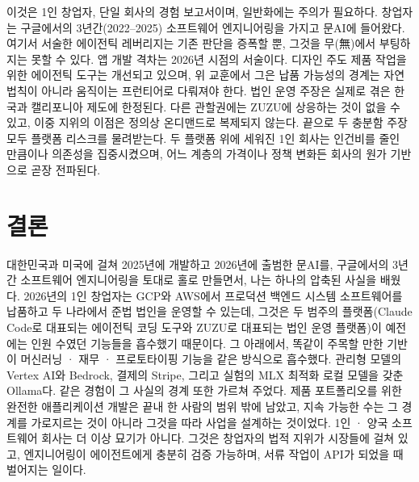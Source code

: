 \documentclass{article}
\begin{document}
이것은 1인 창업자, 단일 회사의 경험 보고서이며, 일반화에는 주의가 필요하다. 창업자는 구글에서의 3년간(2022--2025) 소프트웨어 엔지니어링을 가지고 문AI에 들어왔다. 여기서 서술한 에이전틱 레버리지는 기존 판단을 증폭할 뿐, 그것을 무(無)에서 부팅하지는 못할 수 있다. 앱 개발 격차는 2026년 시점의 서술이다. 디자인 주도 제품 작업을 위한 에이전틱 도구는 개선되고 있으며, 위 교훈에서 그은 납품 가능성의 경계는 자연법칙이 아니라 움직이는 프런티어로 다뤄져야 한다. 법인 운영 주장은 실제로 겪은 한국과 캘리포니아 제도에 한정된다. 다른 관할권에는 ZUZU에 상응하는 것이 없을 수 있고, 이중 지위의 이점은 정의상 온디맨드로 복제되지 않는다. 끝으로 두 충분함 주장 모두 플랫폼 리스크를 물려받는다. 두 플랫폼 위에 세워진 1인 회사는 인건비를 줄인 만큼이나 의존성을 집중시켰으며, 어느 계층의 가격이나 정책 변화든 회사의 원가 기반으로 곧장 전파된다.

\section{결론}

대한민국과 미국에 걸쳐 2025년에 개발하고 2026년에 출범한 문AI를, 구글에서의 3년간 소프트웨어 엔지니어링을 토대로 홀로 만들면서, 나는 하나의 압축된 사실을 배웠다. 2026년의 1인 창업자는 GCP와 AWS에서 프로덕션 백엔드 시스템 소프트웨어를 납품하고 두 나라에서 준법 법인을 운영할 수 있는데, 그것은 두 범주의 플랫폼(Claude Code로 대표되는 에이전틱 코딩 도구와 ZUZU로 대표되는 법인 운영 플랫폼)이 예전에는 인원 수였던 기능들을 흡수했기 때문이다. 그 아래에서, 똑같이 주목할 만한 기반이 머신러닝 · 재무 · 프로토타이핑 기능을 같은 방식으로 흡수했다. 관리형 모델의 Vertex AI와 Bedrock, 결제의 Stripe, 그리고 실험의 MLX 최적화 로컬 모델을 갖춘 Ollama다. 같은 경험이 그 사실의 경계 또한 가르쳐 주었다. 제품 포트폴리오를 위한 완전한 애플리케이션 개발은 끝내 한 사람의 범위 밖에 남았고, 지속 가능한 수는 그 경계를 가로지르는 것이 아니라 그것을 따라 사업을 설계하는 것이었다. 1인 · 양국 소프트웨어 회사는 더 이상 묘기가 아니다. 그것은 창업자의 법적 지위가 시장들에 걸쳐 있고, 엔지니어링이 에이전트에게 충분히 검증 가능하며, 서류 작업이 API가 되었을 때 벌어지는 일이다.
\end{document}
